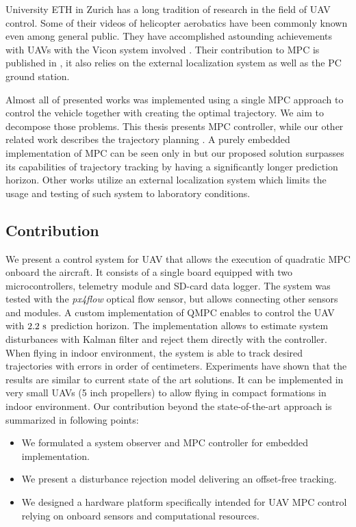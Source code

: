 University ETH in Zurich has a long tradition of research in the field of UAV control. Some of their videos of helicopter aerobatics have been commonly known even among general public. They have accomplished astounding achievements with UAVs with the Vicon system involved \citep{brescianini2013polearobatics, Augugliaro2013buildingstructures}. Their contribution to MPC is published in \citep{ethMueller2013mpc}, it also relies on the external localization system as well as the PC ground station.

Almost all of presented works was implemented using a single MPC approach to control the vehicle together with creating the optimal trajectory. We aim to decompose those problems. This thesis presents MPC controller, while our other related work describes the trajectory planning \citep{saska_baca2014, saska2014formations}. A purely embedded implementation of MPC can be seen only in \citep{alexis2014rmpc} but our proposed solution surpasses its capabilities of trajectory tracking by having a significantly longer prediction horizon. Other works \citep{bangura2014realtimempc, bouffard2012dtic, bouffard2012learning, ethMueller2013mpc, suzuki2014collision} utilize an external localization system which limits the usage and testing of such system to laboratory conditions. 

\subsection{Contribution}

We present a control system for UAV that allows the execution of quadratic MPC onboard the aircraft. It consists of a single board equipped with two microcontrollers, telemetry module and SD-card data logger. The system was tested with the \textit{px4flow} optical flow sensor, but allows connecting other sensors and modules. A custom implementation of QMPC enables to control the UAV with $2.2~\mathrm{s}$ prediction horizon. The implementation allows to estimate system disturbances with Kalman filter and reject them directly with the controller. When flying in indoor environment, the system is able to track desired trajectories with errors in order of centimeters. Experiments have shown that the results are similar to current state of the art solutions. It can be implemented in very small UAVs (5 inch propellers) to allow flying in compact formations in indoor environment. Our contribution beyond the state-of-the-art approach is summarized in following points:

\begin{itemize}
\item We formulated a system observer and MPC controller for embedded implementation.
\item We present a disturbance rejection model delivering an offset-free tracking.
\item We designed a hardware platform specifically intended for UAV MPC control relying on onboard sensors and computational resources.
\end{itemize}

